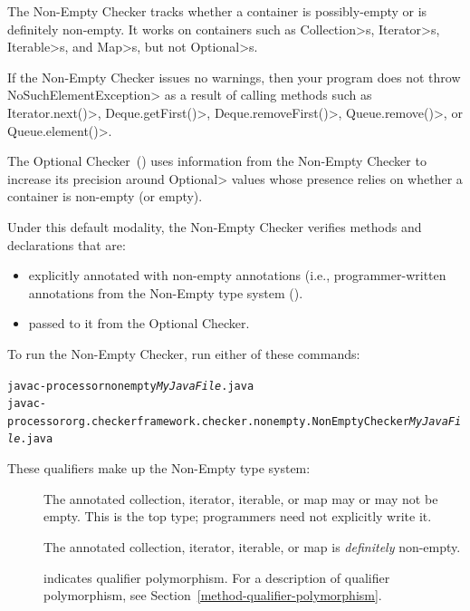 \htmlhr
{}

The Non-Empty Checker tracks whether a container is possibly-empty or is
definitely non-empty.  It works on containers such as
\<Collection>s, \<Iterator>s, \<Iterable>s, and \<Map>s, but not \<Optional>s.

If the Non-Empty Checker issues no warnings, then your program does not
throw \<NoSuchElementException> as a result of calling methods such as
\<Iterator.next()>,
\<Deque.getFirst()>, \<Deque.removeFirst()>, \<Queue.remove()>, or
\<Queue.element()>.

The Optional Checker~() uses information from the
Non-Empty Checker to increase its precision around \<Optional> values whose
presence relies on whether a container is non-empty (or empty).

Under this default modality, the Non-Empty Checker verifies methods and
declarations that are:
\begin{itemize}

\item explicitly annotated with non-empty annotations (i.e., programmer-written
  annotations from the Non-Empty type system
  ().
\item passed to it from the Optional Checker.

\end{itemize}

To run the Non-Empty Checker, run either of these commands:

\begin{alltt}
  javac -processor nonempty \emph{MyJavaFile}.java
  javac -processor org.checkerframework.checker.nonempty.NonEmptyChecker \emph{MyJavaFile}.java
\end{alltt}



These qualifiers make up the Non-Empty type system:

\begin{description}

\item[]
  The annotated collection, iterator, iterable, or map may or may not be empty.
  This is the top type; programmers need not explicitly write it.

\item[]
  The annotated collection, iterator, iterable, or map is \emph{definitely}
  non-empty.

\item[]
  indicates qualifier polymorphism.
  For a description of qualifier polymorphism, see
  Section~\ref{method-qualifier-polymorphism}.

\end{description}

